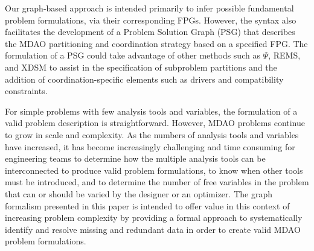 Our graph-based approach is intended primarily to infer possible fundamental problem formulations, via their corresponding FPGs.  However, the syntax also facilitates the development of a Problem Solution Graph (PSG) that describes the MDAO partitioning and coordination strategy based on a specified FPG.  The formulation of a PSG could take advantage of other methods such as $\Psi$, REMS, and XDSM to assist in the specification of subproblem partitions and the addition of coordination-specific elements such as drivers and compatibility constraints.

For simple problems with few analysis tools and variables, the formulation of a
valid problem description is straightforward. However, MDAO problems continue to
grow in scale and complexity. As the numbers of analysis tools and variables have
increased, it has become increasingly challenging and time consuming for engineering
teams to determine how the multiple analysis tools can be interconnected to produce
valid problem formulations, to know when other tools must be introduced, and to
determine the number of free variables in the problem that can or should be
varied by the designer or an optimizer. The graph formalism presented in this
paper is intended to offer value in this context of increasing problem complexity by
providing a formal approach to systematically identify and resolve missing and
redundant data in order to create valid MDAO problem formulations.  